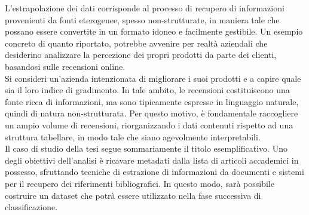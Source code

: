 L'estrapolazione dei dati corrisponde al processo di recupero di informazioni provenienti da fonti eterogenee, spesso non-strutturate, in maniera tale che possano essere convertite in un formato idoneo e facilmente gestibile. Un esempio concreto di quanto riportato, potrebbe avvenire per realtà aziendali che desiderino analizzare la percezione dei propri prodotti da parte dei clienti, basandosi sulle recensioni online. \vspace{7pt} \\
Si consideri un'azienda intenzionata di migliorare i suoi prodotti e a capire quale sia il loro indice di gradimento. In tale ambito, le recensioni costituiscono una fonte ricca di informazioni, ma sono tipicamente espresse in linguaggio naturale, quindi di natura non-strutturata. Per questo motivo, è fondamentale raccogliere un ampio volume di recensioni, riorganizzando i dati contenuti rispetto ad una struttura tabellare, in modo tale che siano agevolmente interpretabili. \vspace{7pt} \\
Il caso di studio della tesi segue sommariamente il titolo esemplificativo. Uno degli obiettivi dell'analisi è ricavare metadati dalla lista di articoli accademici in possesso, sfruttando tecniche di estrazione di informazioni da documenti e sistemi per il recupero dei riferimenti bibliografici. In questo modo, sarà possibile costruire un dataset che potrà essere utilizzato nella fase successiva di classificazione. \vspace{7pt} \\